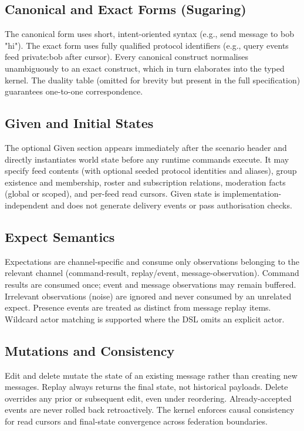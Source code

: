 \documentclass{article}
\begin{document}
\subsection{Canonical and Exact Forms (Sugaring)}

The canonical form uses short, intent-oriented syntax (e.g., send message to bob "hi"). The exact form
uses fully qualified protocol identifiers (e.g., query events feed private:bob after cursor).
Every canonical construct normalises unambiguously to an exact construct, which in turn elaborates
into the typed kernel. The duality table (omitted for brevity but present in the full specification)
guarantees one-to-one correspondence.

\subsection{Given and Initial States}

The optional Given section appears immediately after the scenario header and directly instantiates
world state before any runtime commands execute. It may specify feed contents (with optional seeded
protocol identities and aliases), group existence and membership, roster and subscription relations,
moderation facts (global or scoped), and per-feed read cursors. Given state is implementation-independent
and does not generate delivery events or pass authorisation checks.

\subsection{Expect Semantics}

Expectations are channel-specific and consume only observations belonging to the relevant
channel (command-result, replay/event, message-observation). Command results are consumed once;
event and message observations may remain buffered. Irrelevant observations (noise) are ignored
and never consumed by an unrelated expect. Presence events are treated as distinct from message
replay items. Wildcard actor matching is supported where the DSL omits an explicit actor.

\subsection{Mutations and Consistency}

Edit and delete mutate the state of an existing message rather than creating new messages.
Replay always returns the final state, not historical payloads.
Delete overrides any prior or subsequent edit, even under reordering.
Already-accepted events are never rolled back retroactively.
The kernel enforces causal consistency for read cursors and final-state convergence across federation boundaries.
\end{document}
